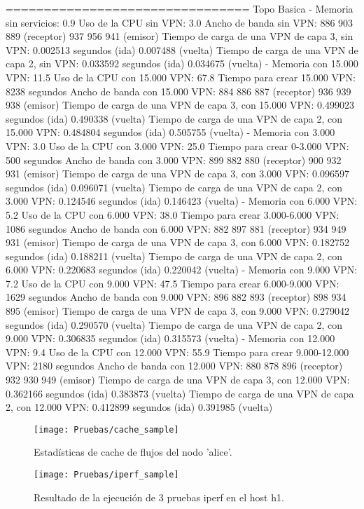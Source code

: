 ================================
Topo Basica
-
Memoria sin servicios: 0.9%
Uso de la CPU sin VPN: 3.0%
Ancho de banda sin VPN: 886 903 889 (receptor) 937 956 941 (emisor)
Tiempo de carga de una VPN de capa 3, sin VPN: 0.002513 segundos (ida) 0.007488 (vuelta)
Tiempo de carga de una VPN de capa 2, sin VPN: 0.033592 segundos (ida) 0.034675 (vuelta)
-
Memoria con 15.000 VPN: 11.5%
Uso de la CPU con 15.000 VPN: 67.8%
Tiempo para crear 15.000 VPN: 8238 segundos
Ancho de banda con 15.000 VPN: 884 886 887 (receptor) 936 939 938 (emisor)
Tiempo de carga de una VPN de capa 3, con 15.000 VPN: 0.499023 segundos (ida) 0.490338 (vuelta)
Tiempo de carga de una VPN de capa 2, con 15.000 VPN: 0.484804 segundos (ida) 0.505755 (vuelta)
-
Memoria con 3.000 VPN: 3.0%
Uso de la CPU con 3.000 VPN: 25.0%
Tiempo para crear 0-3.000 VPN: 500 segundos
Ancho de banda con 3.000 VPN: 899 882 880 (receptor) 900 932 931 (emisor)
Tiempo de carga de una VPN de capa 3, con 3.000 VPN: 0.096597 segundos (ida) 0.096071 (vuelta)
Tiempo de carga de una VPN de capa 2, con 3.000 VPN: 0.124546 segundos (ida) 0.146423 (vuelta)
-
Memoria con 6.000 VPN: 5.2%
Uso de la CPU con 6.000 VPN: 38.0%
Tiempo para crear 3.000-6.000 VPN: 1086 segundos
Ancho de banda con 6.000 VPN: 882 897 881 (receptor) 934 949 931 (emisor)
Tiempo de carga de una VPN de capa 3, con 6.000 VPN: 0.182752 segundos (ida) 0.188211 (vuelta)
Tiempo de carga de una VPN de capa 2, con 6.000 VPN: 0.220683 segundos (ida) 0.220042 (vuelta)
-
Memoria con 9.000 VPN: 7.2%
Uso de la CPU con 9.000 VPN: 47.5%
Tiempo para crear 6.000-9.000 VPN: 1629 segundos
Ancho de banda con 9.000 VPN: 896 882 893 (receptor) 898 934 895 (emisor)
Tiempo de carga de una VPN de capa 3, con 9.000 VPN: 0.279042 segundos (ida) 0.290570 (vuelta)
Tiempo de carga de una VPN de capa 2, con 9.000 VPN: 0.306835 segundos (ida) 0.315573 (vuelta)
-
Memoria con 12.000 VPN: 9.4%
Uso de la CPU con 12.000 VPN: 55.9%
Tiempo para crear 9.000-12.000 VPN: 2180 segundos
Ancho de banda con 12.000 VPN: 880 878 896 (receptor) 932 930 949 (emisor)
Tiempo de carga de una VPN de capa 3, con 12.000 VPN: 0.362166 segundos (ida) 0.383873 (vuelta)
Tiempo de carga de una VPN de capa 2, con 12.000 VPN: 0.412899 segundos (ida) 0.391985 (vuelta)


\begin{figure}[t]
	\caption{Estadísticas de cache de flujos del nodo 'alice'.}
	\texttt{[image: Pruebas/cache\_sample]}
	\centering
	\label{fig:cache_sample}
\end{figure}

\begin{figure}[t]
	\caption{Resultado de la ejecución de 3 pruebas iperf en el host h1.}
	\texttt{[image: Pruebas/iperf\_sample]}
	\centering
	\label{fig:iperf_sample}
\end{figure}